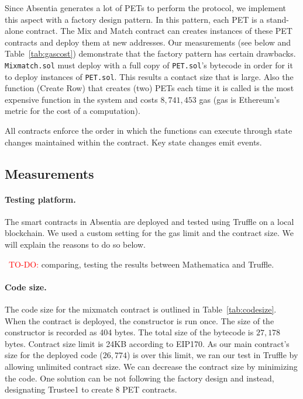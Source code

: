 Since Absentia generates a lot of PETs to perform the protocol, we implement this aspect with a factory design pattern. In this pattern, each PET is a stand-alone contract. The Mix and Match contract can creates instances of these PET contracts and deploy them at new addresses. Our measurements (see below and Table~\ref{tab:gascost}) demonstrate that the factory pattern has certain drawbacks. \texttt{Mixmatch.sol} must deploy with a full copy of \texttt{PET.sol}'s bytecode in order for it to deploy instances of \texttt{PET.sol}. This results a contact size that is large. Also the function (Create Row) that creates (two) PETs each time it is called is the most expensive function in the system and costs $8,741,453$ gas (gas is Ethereum's metric for the cost of a computation). 

All contracts enforce the order in which the functions can execute through state changes maintained within the contract. Key state changes emit events. 



\subsection{Measurements}


\paragraph{Testing platform.} 
The smart contracts in Absentia are deployed and tested using Truffle on a local blockchain. We used a custom setting for the gas limit and the contract size. We will explain the reasons to do so below.

~\textcolor{red}{TO-DO:} comparing, testing the results between Mathematica and Truffle.




\paragraph{Code size.} 

The code size for the mixmatch contract is outlined in Table~\ref{tab:codesize}.  When the contract is deployed, the constructor is run once. The size of the constructor is recorded as 404 bytes. The total size of the bytecode is $27,178$ bytes. Contract size limit is 24KB according to EIP170. As our main contract's size for the deployed code ($26,774$) is over this limit, we ran our test in Truffle by allowing unlimited contract size. We can decrease the contract size by minimizing the code. One solution can be not following the factory design and instead, designating Trustee1 to create 8 PET contracts.


